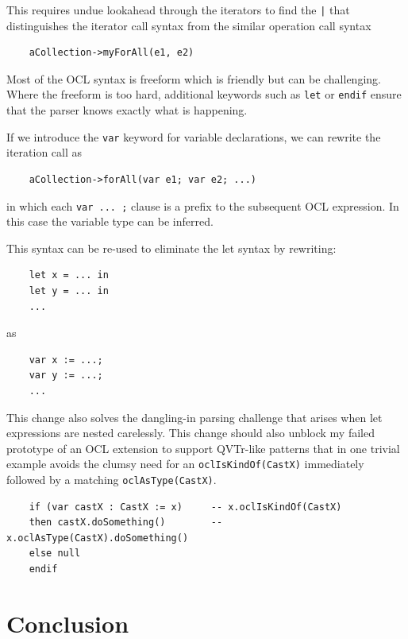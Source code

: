 \documentclass{jot}
\begin{document}
This requires undue lookahead through the iterators to find the \verb$|$ that distinguishes the iterator call syntax from the similar operation call syntax

\begin{verbatim}
    aCollection->myForAll(e1, e2)
\end{verbatim}

Most of the OCL syntax is freeform which is friendly but can be challenging. Where the freeform is too hard, additional keywords such as \verb$let$ or \verb$endif$ ensure that the parser knows exactly what is happening.

If we introduce the \verb$var$ keyword for variable declarations, we can rewrite the iteration call as

\begin{verbatim}
    aCollection->forAll(var e1; var e2; ...)
\end{verbatim}

in which each \verb$var ... ;$ clause is a prefix to the subsequent OCL expression. In this case the variable type can be inferred.

This syntax can be re-used to eliminate the let syntax by rewriting:

\begin{verbatim}
    let x = ... in
    let y = ... in 
    ...
\end{verbatim}

as

\begin{verbatim}
    var x := ...;
    var y := ...; 
    ...
\end{verbatim}

This change also solves the dangling-in parsing challenge that arises when let expressions are nested carelessly. This change should also unblock my failed prototype of an OCL extension to support QVTr-like patterns that in one trivial example avoids the clumsy need for an \verb$oclIsKindOf(CastX)$ immediately followed by a matching \verb$oclAsType(CastX)$.

\begin{verbatim}
    if (var castX : CastX := x)     -- x.oclIsKindOf(CastX)
    then castX.doSomething()        -- x.oclAsType(CastX).doSomething()
    else null
    endif
\end{verbatim}

\section{Conclusion}\label{Conclusion}
\end{document}
